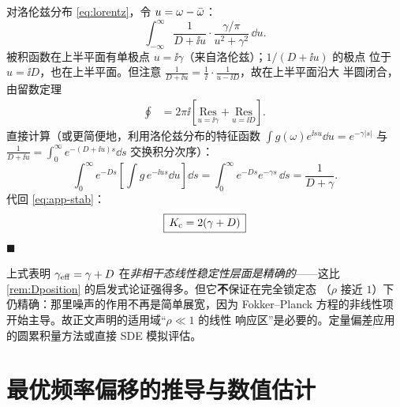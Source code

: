 对洛伦兹分布 \cref{eq:lorentz}，令 $u=\omega-\bar{\omega}$：
%
\begin{equation}
\int_{-\infty}^{\infty}\frac{1}{D+\ii u}\cdot
\frac{\gamma/\pi}{u^{2}+\gamma^{2}}\,\dd u .
\end{equation}
%
被积函数在上半平面有单极点 $u=\ii\gamma$（来自洛伦兹）；$1/(D+\ii u)$ 的极点
位于 $u=\ii D$，也在上半平面。但注意
$\frac{1}{D+\ii u}=\frac{1}{\ii}\cdot\frac{1}{u-\ii D}$，故在上半平面沿大
半圆闭合，由留数定理
%
\begin{align}
\oint &= 2\pi\ii\left[
\underset{u=\ii\gamma}{\mathrm{Res}}+\underset{u=\ii D}{\mathrm{Res}}\right].
\end{align}
%
直接计算（或更简便地，利用洛伦兹分布的特征函数
$\int g(\omega)e^{\ii s u}\dd u=e^{-\gamma|s|}$ 与
$\frac{1}{D+\ii u}=\int_{0}^{\infty}e^{-(D+\ii u)s}\dd s$ 交换积分次序）：
%
\begin{equation}
\int_{0}^{\infty}e^{-Ds}\left[\int g\,e^{-\ii u s}\dd u\right]\dd s
=\int_{0}^{\infty}e^{-Ds}e^{-\gamma s}\,\dd s
=\frac{1}{D+\gamma} .
\end{equation}
%
代回 \cref{eq:app-stab}：
%
\begin{equation}
\boxed{\,K_{\mathrm{c}}=2(\gamma+D)\,}
\end{equation}
%
\hfill$\blacksquare$

\begin{remark}\label{rem:geffstatus}
上式表明 $\gamma_{\mathrm{eff}}=\gamma+D$ 在\emph{非相干态线性稳定性层面是精确的}——这比
\cref{rem:Dposition} 的启发式论证强得多。但它\textbf{不}保证在完全锁定态
（$\rho$ 接近 $1$）下仍精确：那里噪声的作用不再是简单展宽，因为
Fokker--Planck 方程的非线性项开始主导。故正文声明的适用域“$\rho\ll1$ 的线性
响应区”是必要的。定量偏差应用 \citet{Tyulkina2018} 的圆累积量方法或直接
SDE 模拟评估。
\end{remark}

\section{最优频率偏移的推导与数值估计}
\label{app:offset}

